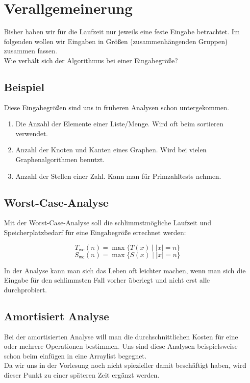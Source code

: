 \section{Verallgemeinerung}

Bisher haben wir für die Laufzeit nur jeweils eine feste Eingabe betrachtet. Im folgenden wollen wir Eingaben in Größen (zusammenhängenden Gruppen) zusammen fassen.\\
Wie verhält sich der Algorithmus bei einer Eingabegröße?

\subsection{Beispiel}

Diese Eingabegrößen sind uns in früheren Analysen schon untergekommen.

\begin{enumerate}[\bfseries 1.]

\item Die Anzahl der Elemente einer Liste/Menge. Wird oft beim sortieren verwendet.

\item Anzahl der Knoten und Kanten eines Graphen. Wird bei vielen Graphenalgorithmen benutzt.

\item Anzahl der Stellen einer Zahl. Kann man für Primzahltests nehmen.

\end{enumerate}

\subsection{Worst-Case-Analyse}

Mit der Worst-Case-Analyse soll die schlimmstmögliche Laufzeit und Speicherplatzbedarf für eine Eingabegröße errechnet werden:

$$
T_{\text{wc}}(n) = \max \{ T(x) \; | \; |x|=n \}
$$
$$
S_{\text{wc}}(n) = \max \{ S(x) \; | \; |x| = n\}
$$

In der Analyse kann man sich das Leben oft leichter machen, wenn man sich die Eingabe für den schlimmsten Fall vorher überlegt und nicht erst alle durchprobiert.

\subsection{Amortisiert Analyse}

Bei der amortisierten Analyse will man die durchschnittlichen Kosten für eine oder mehrere Operationen bestimmen.
Uns sind diese Analysen beispielsweise schon beim einfügen in eine Arraylist begegnet.\\

Da wir uns in der Vorlesung noch nicht spiezieller damit beschäftigt haben, wird dieser Punkt zu einer späteren Zeit ergänzt werden.